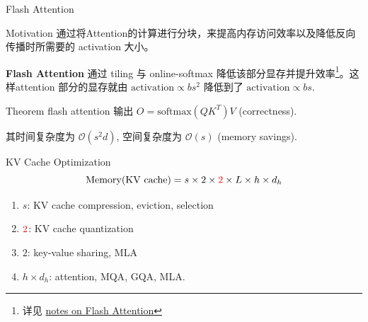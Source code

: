 \documentclass[aspectratio=169]{beamer}
\newcommand{\redtwo}{\textcolor{red}{2}}
\begin{document}
\begin{frame}{Flash Attention\cite{dao2022flashattentionfastmemoryefficientexact}}
    \small
  \begin{block}{Motivation}
      通过将Attention的计算进行分块，来提高内存访问效率以及降低反向传播时所需要的 activation 大小。
  \end{block}
    
  \textbf{Flash Attention} 通过 tiling 与 online-softmax 降低该部分显存并提升效率\footnote{详见 \href{https://maosong.website/p/notes-on-flashattention/}{notes on Flash Attention}}。这样attention 部分的显存就由 $\mathrm{activation}\propto bs^2$ 降低到了 $\mathrm{activation}\propto bs$. 

  \begin{block}{Theorem}
    flash attention 输出 $O=\mathrm{softmax}(QK^T)V$ (correctness).

    其时间复杂度为 $\mathcal{O}(s^2d)$, 空间复杂度为 $\mathcal{O}(s)$ (memory savings).
  \end{block}
\end{frame}


\begin{frame}{KV Cache Optimization\cite{li2025surveylargelanguagemodel}}
    \begin{equation*}
    \mathrm{Memory}(\mathrm{KV\ cache})
    = s \times 2 \times \redtwo \times L \times h \times d_h
  \end{equation*}
  \begin{enumerate}
      \item $s$: KV cache compression, eviction, selection
      \item $\redtwo$: KV cache quantization
      \item $2$: key-value sharing, MLA\cite{deepseekai2024deepseekv2strongeconomicalefficient}
      \item $h\times d_h$: attention, MQA\cite{shazeer2019fasttransformerdecodingwritehead}, GQA\cite{ainslie2023gqatraininggeneralizedmultiquery}, MLA.
  \end{enumerate}
\end{frame}
\end{document}
